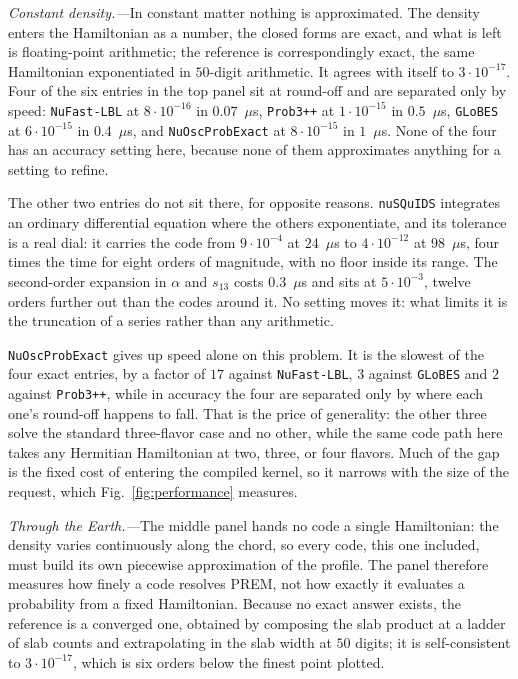 \documentclass[final,5p,times,twocolumn,sort,compress]{elsarticle}
\newcommand{\fig}{Fig.}
\newcommand{\figu}[1]{\fig~\ref{fig:#1}}
\begin{document}
\smallskip

\textit{Constant density.---}In constant matter nothing is approximated.  The density enters the Hamiltonian as a number, the closed forms are exact, and what is left is floating-point arithmetic; the reference is correspondingly exact, the same Hamiltonian exponentiated in $50$-digit arithmetic.  It agrees with itself to $3 \cdot 10^{-17}$.  Four of the six entries in the top panel sit at round-off and are separated only by speed: {\tt NuFast-LBL} at $8 \cdot 10^{-16}$ in $0.07$~$\mu$s, {\tt Prob3++} at $1 \cdot 10^{-15}$ in $0.5$~$\mu$s, {\tt GLoBES} at $6 \cdot 10^{-15}$ in $0.4$~$\mu$s, and {\tt NuOscProbExact} at $8 \cdot 10^{-15}$ in $1$~$\mu$s.  None of the four has an accuracy setting here, because none of them approximates anything for a setting to refine.

The other two entries do not sit there, for opposite reasons.  {\tt nuSQuIDS} integrates an ordinary differential equation where the others exponentiate, and its tolerance is a real dial: it carries the code from $9 \cdot 10^{-4}$ at $24$~$\mu$s to $4 \cdot 10^{-12}$ at $98$~$\mu$s, four times the time for eight orders of magnitude, with no floor inside its range.  The second-order expansion in $\alpha$ and $s_{13}$ costs $0.3$~$\mu$s and sits at $5 \cdot 10^{-3}$, twelve orders further out than the codes around it.  No setting moves it: what limits it is the truncation of a series rather than any arithmetic.

{\tt NuOscProbExact} gives up speed alone on this problem.  It is the slowest of the four exact entries, by a factor of $17$ against {\tt NuFast-LBL}, $3$ against {\tt GLoBES} and $2$ against {\tt Prob3++}, while in accuracy the four are separated only by where each one's round-off happens to fall.  That is the price of generality: the other three solve the standard three-flavor case and no other, while the same code path here takes any Hermitian Hamiltonian at two, three, or four flavors.  Much of the gap is the fixed cost of entering the compiled kernel, so it narrows with the size of the request, which \figu{performance} measures.

\smallskip

\textit{Through the Earth.---}The middle panel hands no code a single Hamiltonian: the density varies continuously along the chord, so every code, this one included, must build its own piecewise approximation of the profile.  The panel therefore measures how finely a code resolves PREM, not how exactly it evaluates a probability from a fixed Hamiltonian.  Because no exact answer exists, the reference is a converged one, obtained by composing the slab product at a ladder of slab counts and extrapolating in the slab width at $50$ digits; it is self-consistent to $3 \cdot 10^{-17}$, which is six orders below the finest point plotted.
\end{document}

